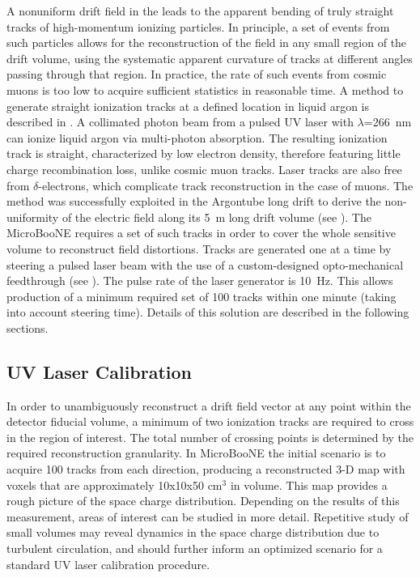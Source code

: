A nonuniform drift field in the \lartpc leads to the apparent bending of truly straight tracks of high-momentum ionizing particles. In principle, a set of events from such particles allows for the reconstruction of the field in any small region of the \lartpc drift volume, using the systematic apparent curvature of tracks at different angles passing through that region. In practice, the rate of such events from cosmic muons is too low to acquire sufficient statistics in reasonable time. A method to generate straight ionization tracks at a defined location in liquid argon is described in \cite{Badhrees:2010}. A collimated photon beam from a pulsed UV laser with $\lambda$=266~nm can ionize liquid argon via multi-photon absorption. The resulting ionization track is straight, characterized by low electron density, therefore featuring little charge recombination loss, unlike cosmic muon tracks. Laser tracks are also free from $\delta$-electrons, which complicate track reconstruction in the case of muons. The method was successfully exploited in the Argontube long drift \lartpc \cite{Badhrees:2012-argontube,Ereditato:2013-argontube,Zeller:2013-argontube} to derive the non-uniformity of the electric field along its 5~m long drift volume (see \cite{Ereditato:2014-argontubedrift}). The MicroBooNE \lartpc requires a set of such tracks in order to cover the whole sensitive volume to reconstruct field distortions. Tracks are generated one at a time by steering a pulsed laser beam with the use of a custom-designed opto-mechanical feedthrough (see \cite{Ereditato:2014-laser}). The pulse rate of the laser generator is 10~Hz. This allows production of a minimum required set of 100 tracks within one minute (taking into account steering time). Details of this solution are described in the following sections.

\subsection{UV Laser Calibration}
In order to unambiguously reconstruct a drift field vector at any point within the detector fiducial volume, a minimum of two ionization tracks are required to cross in the region of interest. The total number of crossing points is determined by the required reconstruction granularity. In MicroBooNE the initial scenario is to acquire 100 tracks from each direction, producing a reconstructed 3-D map with voxels that are approximately 10x10x50 cm$^3$ in volume. This map provides a rough picture of the space charge distribution. Depending on the results of this measurement, areas of interest can be studied in more detail. Repetitive study of small volumes may reveal dynamics in the space charge distribution due to turbulent circulation, and should further inform an optimized scenario for a standard UV laser calibration procedure.  


